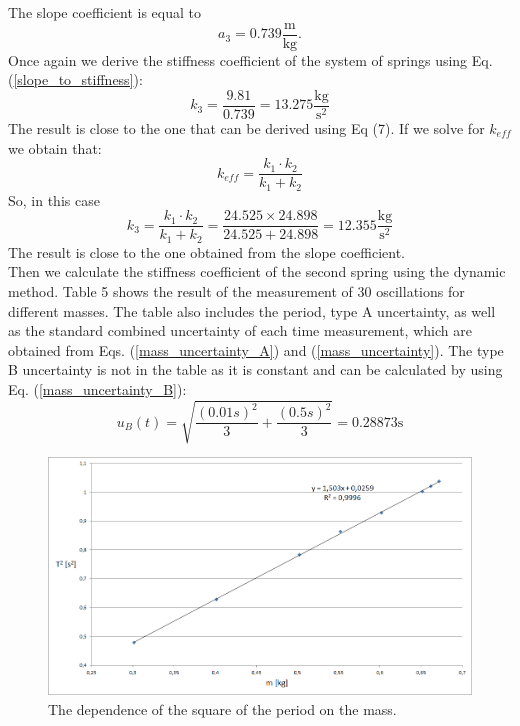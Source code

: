 \documentclass[a4paper,12pt,titlepage,bibliography=numbered]{article}
\begin{document}
\noindent The slope coefficient is equal to
\begin{equation}
    a_3 = 0.739 \mathrm{\frac{m}{kg}}.
\end{equation}
Once again we derive the stiffness coefficient of the system of springs using Eq. (\ref{slope_to_stiffness}): \\ 
\begin{equation}
    k_3 = \frac{9.81}{0.739}  = 13.275 \mathrm{\frac{kg}{s^2}}
    \label{k_3}
\end{equation}
The result is close to the one that can be derived using Eq (7). If we solve for \(k_{eff}\) we obtain that:
\begin{equation}
    k_{eff} = \frac{k_1 \cdot k_2}{k_1 + k_2}
\end{equation}
So, in this case
\begin{equation}
    k_3 = \frac{k_1 \cdot k_2}{k_1 + k_2} = \frac{24.525 \times 24.898}{24.525+24.898} = 12.355 \mathrm{\frac{kg}{s^2}}
\end{equation}
The result is close to the one obtained from the slope coefficient. \\
Then we calculate the stiffness coefficient of the second spring using the dynamic method. Table 5 shows the result of the measurement of 30 oscillations for different masses. The table also includes the period, type A uncertainty, as well as the standard combined uncertainty of each time measurement, which are obtained from Eqs. (\ref{mass_uncertainty_A}) and (\ref{mass_uncertainty}). The type B uncertainty is not in the table as it is constant and can be calculated by using Eq. (\ref{mass_uncertainty_B}): \\
\begin{equation}
    u_B(t) = \sqrt{\frac{(0.01 s)^2}{3} + \frac{(0.5 s)^2}{3}} = 0.28873 \mathrm{s}
\end{equation}
\begin{figure}[H]
\centering
\includegraphics[width=1\textwidth]{fig4.png}
\caption{The dependence of the square of the period on the mass.}
\label{fig_4}
\end{figure}
\end{document}
